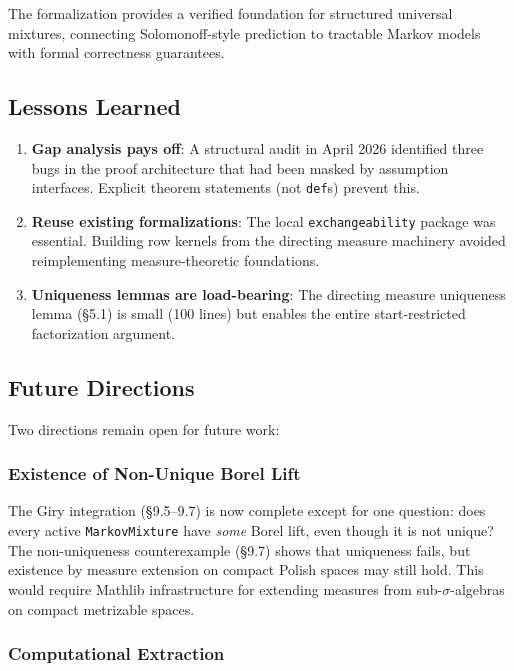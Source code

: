 \documentclass[11pt,a4paper]{article}
\theoremstyle{definition}
\begin{document}
The formalization provides a verified foundation for structured universal
mixtures, connecting Solomonoff-style prediction to tractable Markov models
with formal correctness guarantees.

\subsection{Lessons Learned}

\begin{enumerate}
\item \textbf{Gap analysis pays off}: A structural audit in April 2026
  identified three bugs in the proof architecture that had been masked by
  assumption interfaces. Explicit theorem statements (not \texttt{def}s)
  prevent this.
\item \textbf{Reuse existing formalizations}: The local \texttt{exchangeability}
  package was essential. Building row kernels from the directing measure
  machinery avoided reimplementing measure-theoretic foundations.
\item \textbf{Uniqueness lemmas are load-bearing}: The directing measure
  uniqueness lemma (\S5.1) is small (100 lines) but enables the entire
  start-restricted factorization argument.
\end{enumerate}

\subsection{Future Directions}

Two directions remain open for future work:

\subsubsection{Existence of Non-Unique Borel Lift}

The Giry integration (\S9.5--9.7) is now complete except for one question:
does every active \texttt{MarkovMixture} have \emph{some} Borel lift, even
though it is not unique? The non-uniqueness counterexample (\S9.7) shows that
uniqueness fails, but existence by measure extension on compact Polish spaces
may still hold. This would require Mathlib infrastructure for extending measures
from sub-$\sigma$-algebras on compact metrizable spaces.

\subsubsection{Computational Extraction}
\end{document}
